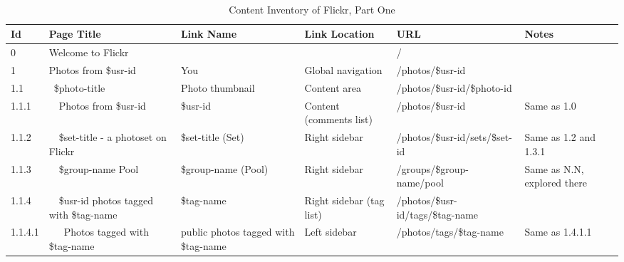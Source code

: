 \documentclass[12pt,a4paper]{article}
\begin{document}
\begin{landscape}
  \begin{table}[h!b!p!]
    \caption{Content Inventory of Flickr, Part One}
    \label{table:content.inventory.flickr.1}
    \begin{center}
      \begin{tiny}
        \tt
        \begin{tabular}{l|l|l|l|l|p{3cm}}
            Id &
            Page Title &
            Link Name &
            Link Location &
            URL &
            Notes \\

            \hline

            0 &
            Welcome to Flickr &
            &
            &
            / &
            \\

            1 &
            Photos from \$usr-id &
            You &
            Global navigation &
            /photos/\$usr-id &
            \\

              1.1 &
              ~\$photo-title &
              Photo thumbnail &
              Content area &
              /photos/\$usr-id/\$photo-id &
              \\

                1.1.1 &
                ~~Photos from \$usr-id &
                \$usr-id &
                Content (comments list) &
                /photos/\$usr-id &
                Same as 1.0\\

                1.1.2 &
                ~~\$set-title - a photoset on Flickr &
                \$set-title (Set) &
                Right sidebar &
                /photos/\$usr-id/sets/\$set-id &
                Same as 1.2 and 1.3.1 \\

                1.1.3 &
                ~~\$group-name Pool &
                \$group-name (Pool) &
                Right sidebar &
                /groups/\$group-name/pool &
                Same as N.N, explored there \\

                1.1.4 &
                ~~\$usr-id photos tagged with \$tag-name &
                \$tag-name &
                Right sidebar (tag list) &
                /photos/\$usr-id/tags/\$tag-name &
                \\

                  1.1.4.1 &
                  ~~~Photos tagged with \$tag-name &
                  public photos tagged with \$tag-name &
                  Left sidebar &
                  /photos/tags/\$tag-name &
                  Same as 1.4.1.1 \\


\end{tabular}
\end{tiny}
\end{center}
\end{table}
\end{landscape}
\end{document}
